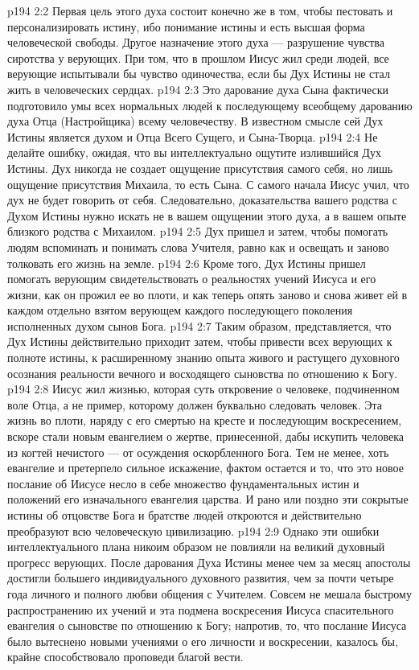 \vs p194 2:2 \pc Первая цель этого духа состоит конечно же в том, чтобы пестовать и персонализировать истину, ибо понимание истины и есть высшая форма человеческой свободы. Другое назначение этого духа --- разрушение чувства сиротства у верующих. При том, что в прошлом Иисус жил среди людей, все верующие испытывали бы чувство одиночества, если бы Дух Истины не стал жить в человеческих сердцах.
\vs p194 2:3 Это дарование духа Сына фактически подготовило умы всех нормальных людей к последующему всеобщему дарованию духа Отца (Настройщика) всему человечеству. В известном смысле сей Дух Истины является духом и Отца Всего Сущего, и Сына\hyp{}Творца.
\vs p194 2:4 Не делайте ошибку, ожидая, что вы интеллектуально ощутите излившийся Дух Истины. Дух никогда не создает ощущение присутствия самого себя, но лишь ощущение присутствия Михаила, то есть Сына. С самого начала Иисус учил, что дух не будет говорить от себя. Следовательно, доказательства вашего родства с Духом Истины нужно искать не в вашем ощущении этого духа, а в вашем опыте близкого родства с Михаилом.
\vs p194 2:5 Дух пришел и затем, чтобы помогать людям вспоминать и понимать слова Учителя, равно как и освещать и заново толковать его жизнь на земле.
\vs p194 2:6 Кроме того, Дух Истины пришел помогать верующим свидетельствовать о реальностях учений Иисуса и его жизни, как он прожил ее во плоти, и как теперь опять заново и снова живет ей в каждом отдельно взятом верующем каждого последующего поколения исполненных духом сынов Бога.
\vs p194 2:7 Таким образом, представляется, что Дух Истины действительно приходит затем, чтобы привести всех верующих к полноте истины, к расширенному знанию опыта живого и растущего духовного осознания реальности вечного и восходящего сыновства по отношению к Богу.
\vs p194 2:8 \pc Иисус жил жизнью, которая суть откровение о человеке, подчиненном воле Отца, а не пример, которому должен буквально следовать человек. Эта жизнь во плоти, наряду с его смертью на кресте и последующим воскресением, вскоре стали новым евангелием о жертве, принесенной, дабы искупить человека из когтей нечистого --- от осуждения оскорбленного Бога. Тем не менее, хоть евангелие и претерпело сильное искажение, фактом остается и то, что это новое послание об Иисусе несло в себе множество фундаментальных истин и положений его изначального евангелия царства. И рано или поздно эти сокрытые истины об отцовстве Бога и братстве людей откроются и действительно преобразуют всю человеческую цивилизацию.
\vs p194 2:9 Однако эти ошибки интеллектуального плана никоим образом не повлияли на великий духовный прогресс верующих. После дарования Духа Истины менее чем за месяц апостолы достигли большего индивидуального духовного развития, чем за почти четыре года личного и полного любви общения с Учителем. Совсем не мешала быстрому распространению их учений и эта подмена  воскресения Иисуса  спасительного евангелия о сыновстве по отношению к Богу; напротив, то, что послание Иисуса было вытеснено новыми учениями о его личности и воскресении, казалось бы, крайне способствовало проповеди благой вести.
